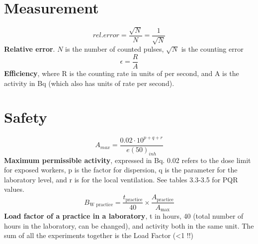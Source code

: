\section{Measurement}
\[rel. error = \frac{\sqrt{N}}{N} = \frac{1}{\sqrt{N}}\]
\textbf{Relative error}. $N$ is the number of counted pulses, $\sqrt{N}$ is the counting error\\
\[\epsilon = \frac{R}{A}\]
\textbf{Efficiency}, where R is the counting rate in units of per second, and A is the activity in Bq (which also has units of rate per second).\\

\section{Safety}
\[A_{max}=\frac{0.02\cdot10^{p+q+r}}{e(50)_{inh}}\]
\textbf{Maximum permissible activity}, expressed in Bq. 0.02 refers to the dose limit for exposed workers, p is the factor for dispersion, q is the parameter for the laboratory level, and r is for the local ventilation. See tables 3.3-3.5 for PQR values.
\[    B_{\text{W practice}} = \frac{t_{\text{practice}}}{40} \times \frac{A_{\text{practice}}}{A_{\text{max}}}\]
\textbf{Load factor of a practice in a laboratory}, t in hours, 40 (total number of hours in the laboratory, can be changed), and activity both in the same unit. The sum of all the experiments together is the Load Factor (<1 !!)
